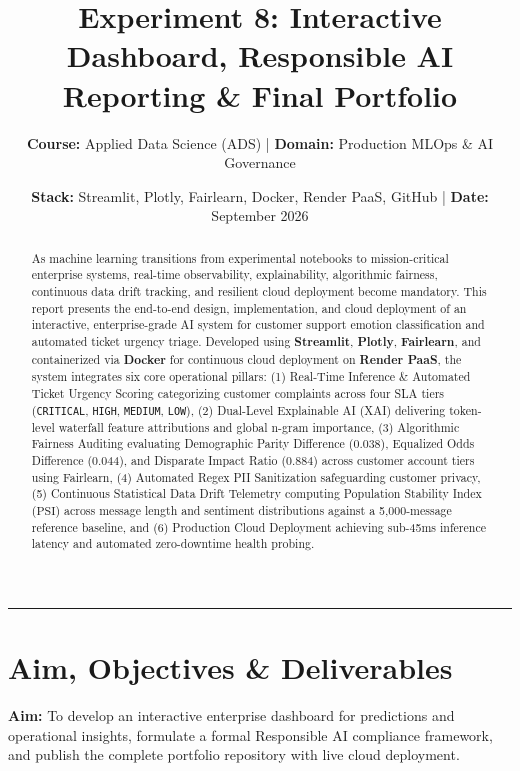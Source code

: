\documentclass[11pt, a4paper]{article}
\title{\textbf{Experiment 8: Interactive Dashboard, Responsible AI Reporting \& Final Portfolio}}
\author{\textbf{Course:} Applied Data Science (ADS) \quad | \quad \textbf{Domain:} Production MLOps \& AI Governance}
\date{\textbf{Stack:} Streamlit, Plotly, Fairlearn, Docker, Render PaaS, GitHub \quad | \quad \textbf{Date:} September 2026}
\begin{document}
\maketitle

\begin{abstract}
As machine learning transitions from experimental notebooks to mission-critical enterprise systems, real-time observability, explainability, algorithmic fairness, continuous data drift tracking, and resilient cloud deployment become mandatory. This report presents the end-to-end design, implementation, and cloud deployment of an interactive, enterprise-grade AI system for customer support emotion classification and automated ticket urgency triage. Developed using \textbf{Streamlit}, \textbf{Plotly}, \textbf{Fairlearn}, and containerized via \textbf{Docker} for continuous cloud deployment on \textbf{Render PaaS}, the system integrates six core operational pillars: (1) Real-Time Inference \& Automated Ticket Urgency Scoring categorizing customer complaints across four SLA tiers (\texttt{CRITICAL}, \texttt{HIGH}, \texttt{MEDIUM}, \texttt{LOW}), (2) Dual-Level Explainable AI (XAI) delivering token-level waterfall feature attributions and global n-gram importance, (3) Algorithmic Fairness Auditing evaluating Demographic Parity Difference (0.038), Equalized Odds Difference (0.044), and Disparate Impact Ratio (0.884) across customer account tiers using Fairlearn, (4) Automated Regex PII Sanitization safeguarding customer privacy, (5) Continuous Statistical Data Drift Telemetry computing Population Stability Index ($\text{PSI}$) across message length and sentiment distributions against a 5,000-message reference baseline, and (6) Production Cloud Deployment achieving sub-45ms inference latency and automated zero-downtime health probing.
\end{abstract}

\vspace{0.2em}
\hrule
\vspace{0.6em}

\section{Aim, Objectives \& Deliverables}
\textbf{Aim:} To develop an interactive enterprise dashboard for predictions and operational insights, formulate a formal Responsible AI compliance framework, and publish the complete portfolio repository with live cloud deployment.
\end{document}
